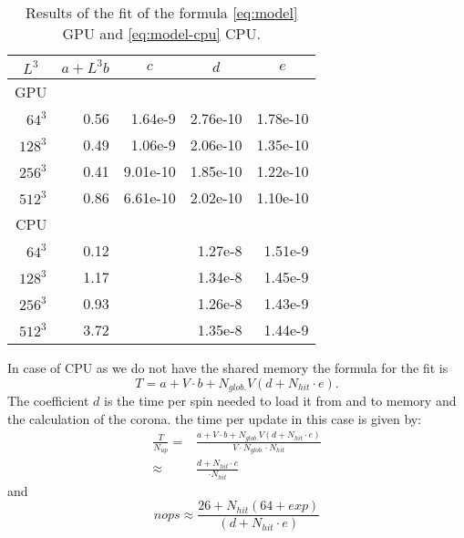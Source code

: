 \documentclass[a4paper]{llncs}
\begin{document}
\begin{table}
\begin{center}
\begin{tabular}{||r|D{.}{.}{8}|D{.}{.}{8}|D{.}{.}{8}|D{.}{.}{8}||}
\hline\hline
{} 
& 
& 
& 
&\\\hline\hline
GPU & \\\hline
$64^3$  & 0.56  & 1.64e-9       & 	2.76e-10       & 1.78e-10 \\
$128^3$ & 0.49  & 1.06e-9       &	2.06e-10       & 1.35e-10 \\
$256^3$ & 0.41  & 9.01e-10	&       1.85e-10       & 1.22e-10\\
$512^3$ & 0.86  & 6.61e-10	&       2.02e-10       & 1.10e-10\\\hline\hline
CPU & \\\hline
$64^3$  &  0.12 &       & 	1.27e-8 &	1.51e-9\\
$128^3$ & 1.17  &       &	1.34e-8 & 	1.45e-9\\
$256^3$ & 0.93  &       &	1.26e-8 &       1.43e-9\\
$512^3$ & 3.72  &       &       1.35e-8 &       1.44e-9\\\hline\hline
\end{tabular}
\end{center}
\caption{\label{tab:fit}Results of the fit of the formula \eqref{eq:model} GPU and \eqref{eq:model-cpu} CPU.}
\end{table}
In case of CPU as we do not have the shared memory the formula for the fit is
\begin{equation}\label{eq:model-cpu}
T  = a+ V \cdot b +
N_{glob.} V \left(d + N_{hit}\cdot e\right) . 
\end{equation}
The coefficient $d$ is the time per spin needed to load it from and to
memory and the calculation of the corona. the time per update  in this case is given by:
\begin{equation}\begin{split}
\frac{T}{N_{up}}=&\frac{a+ V \cdot b + N_{glob.} V \left(d + N_{hit}\cdot e\right)}{V\cdot N_{glob.}\cdot N_{hit}}\\
\approx&
\frac{d + N_{hit}\cdot e}{\cdot N_{hit}}
\end{split}
\end{equation}
and
\begin{equation}
nops\approx \frac{ 26+N_{hit}(64+exp)}{ \left(d + N_{hit}\cdot e\right)}
\end{equation}
\end{document}
